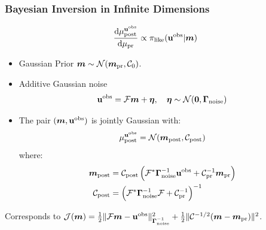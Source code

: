 \documentclass[
  pdf,
  10pt,
  xcolor={svgnames},
]{beamer}
\newcommand{\mc}[1]{\mathcal{#1}}
\renewcommand{\vec}[1]{{\mathchoice
                     {\mbox{\boldmath$\displaystyle{#1}$}}
                     {\mbox{\boldmath$\textstyle{#1}$}}
                     {\mbox{\boldmath$\scriptstyle{#1}$}}
                     {\mbox{\boldmath$\scriptscriptstyle{#1}$}}}}
\newcommand{\mat}[1]{\mathbf{{#1}}}
\newcommand{\obs}{\mathbf{u}^{\rm obs}}
\begin{document}
\begin{frame}
  \frametitle{Bayesian Inversion in Infinite Dimensions}
  \begin{theorem}
    \[
      \dv{\mu^{\obs}_{\rm post}}{\mu_{\rm pr}}
      \propto
      \pi_{\rm like}(\obs | \vec{m})
    \]
  \end{theorem}
  \begin{itemize}
    \item Gaussian Prior $\vec{m} \sim \mc{N}(\vec{m}_{\rm pr}, \mc{C}_0)$.
    \item Additive Gaussian noise
      \[
        \obs = \mc{F} \vec{m} + \vb*{\eta},
        \quad \vb*{\eta} \sim \mc{N}(\vb{0}, \mat{\Gamma}_{\rm noise})
      \]
    \item The pair $(\vec{m}, \obs)$ is jointly Gaussian with:
      \[
        \mu^{\obs}_{\rm post}
        =
        \mc{N}(\vec{m}_{\rm post} , \mc{C}_{\rm post})
      \]
      where:
      \begin{align*}
        \vec{m}_{\rm post}
        &=
        \mc{C}_{\rm post}
        \left(
          \mc{F}^* \vb{\Gamma}_{\rm noise}^{-1} \obs
          + \mc{C}_{\rm pr}^{-1} \vec{m}_{\rm pr}
        \right) \\
        \mc{C}_{\rm post}
        &=
        \left(
          \mc{F}^* \vb{\Gamma}_{\rm noise}^{-1} \mc{F}
          + \mc{C}_{\rm pr}^{-1}
        \right)^{-1} \\
      \end{align*}
  \end{itemize} \vspace{-1em}
  Corresponds to
  \(
    \mc{J}(\vec{m})
    = \frac{1}{2} \| \mc{F}\vec{m} - \obs \|_{\vb{\Gamma}_{\rm noise}^{-1}}^2
    + \frac{1}{2} \| \mc{C}^{-1/2}(\vec{m}-\vec{m}_{\rm pr}) \|^2
  \).
\end{frame}
\end{document}
